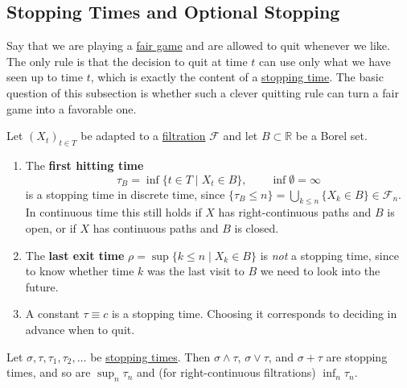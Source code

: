 	\subsection{Stopping Times and Optional Stopping}

	Say that we are playing a \hyperref[def:martingale]{fair game} and are allowed to quit whenever we like. The only rule is that the decision to quit at time $t$ can use only what we have seen up to time $t$, which is exactly the content of a \hyperref[def:stopping-time]{stopping time}. The basic question of this subsection is whether such a clever quitting rule can turn a fair game into a favorable one. 

	\begin{example}
	  \label{ex:hitting-times}
		Let $(X_t)_{t \in T}$ be adapted to a \hyperref[def:filtration]{filtration} $\mathscr{F}$ and let $B \subset \mathbb{R}$ be a Borel set. 
		\begin{enumerate}
			\item The \textbf{first hitting time} 
				\begin{equation}
					\tau_B = \inf\{t \in T \mid X_t \in B\}, \qquad \inf \emptyset = \infty
				\end{equation}
			is a stopping time in discrete time, since $\{\tau_B \leq n\} = \bigcup_{k \leq n} \{X_k \in B\} \in \mathcal{F}_n$. In continuous time this still holds if $X$ has right-continuous paths and $B$ is open, or if $X$ has continuous paths and $B$ is closed. 
			\item The \textbf{last exit time} $\rho = \sup\{k \leq n \mid X_k \in B\}$ is \textit{not} a stopping time, since to know whether time $k$ was the last visit to $B$ we need to look into the future. 
			\item A constant $\tau \equiv c$ is a stopping time. Choosing it corresponds to deciding in advance when to quit. 
		\end{enumerate}
	\end{example}

	\begin{lemma}
	  \label{lem:stopping-time-closure}
		Let $\sigma, \tau, \tau_1, \tau_2, \ldots$ be \hyperref[def:stopping-time]{stopping times}. Then $\sigma \wedge \tau$, $\sigma \vee \tau$, and $\sigma + \tau$ are stopping times, and so are $\sup_n \tau_n$ and (for right-continuous filtrations) $\inf_n \tau_n$. 
	\end{lemma}

